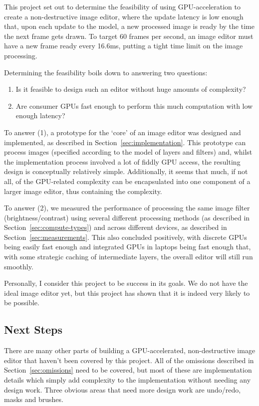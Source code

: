 \documentclass[12pt]{article}
\begin{document}
This project set out to determine the feasibility of using GPU-acceleration to create a
non-destructive image editor, where the update latency is low enough that, upon each update to the
model, a new processed image is ready by the time the next frame gets drawn.  To target 60 frames
per second, an image editor must have a new frame ready every 16.6ms, putting a tight time limit on
the image processing.

Determining the feasibility boils down to answering two questions:

\begin{enumerate}
    \item Is it feasible to design such an editor without huge amounts of complexity?
    \item Are consumer GPUs fast enough to perform this much computation with low enough latency?
\end{enumerate}

To answer (1), a prototype for the `core' of an image editor was designed and implemented, as
described in Section~\ref{sec:implementation}.  This prototype can process images (specified
according to the model of layers and filters) and, whilst the implementation process involved a lot
of fiddly GPU access, the resulting design is conceptually relatively simple.  Additionally, it
seems that much, if not all, of the GPU-related complexity can be encapsulated into one component of
a larger image editor, thus containing the complexity.

To answer (2), we measured the performance of processing the same image filter (brightness/contrast)
using several different processing methods (as described in Section~\ref{sec:compute-types}) and
across different devices, as described in Section~\ref{sec:measurements}.  This also concluded
positively, with discrete GPUs being easily fast enough and integrated GPUs in laptops being fast
enough that, with some strategic caching of intermediate layers, the overall editor will still run
smoothly.

Personally, I consider this project to be success in its goals.  We do not have the ideal image
editor yet, but this project has shown that it is indeed very likely to be possible.

\subsection{Next Steps}\label{sec:next-steps}

There are many other parts of building a GPU-accelerated, non-destructive image editor that
haven't been covered by this project.  All of the omissions described in Section~\ref{sec:omissions}
need to be covered, but most of these are implementation details which simply add complexity to the
implementation without needing any design work.  Three obvious areas that need more design work are
undo/redo, masks and brushes.
\end{document}
